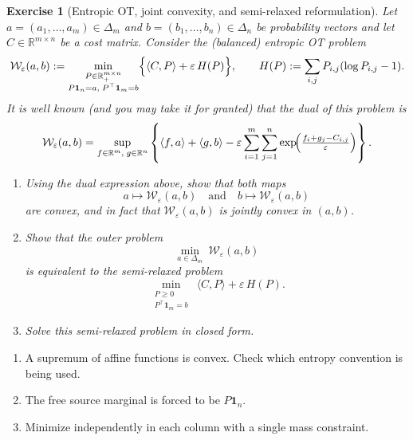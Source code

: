 \documentclass[11pt,a4paper]{article}
\theoremstyle{exostyle}
\newtheorem{exercise}{Exercise}
\newcommand{\R}{\mathbb{R}}
\newcommand{\W}{\mathcal{W}}
\begin{document}
\begin{exercise}[Entropic OT, joint convexity, and semi-relaxed reformulation]\label{ex:semi-relaxed-simple}
Let $a=(a_1,\dots,a_m)\in\Delta_m$ and $b=(b_1,\dots,b_n)\in\Delta_n$ be probability vectors and let $C\in\R^{m\times n}$ be a cost matrix. Consider the (balanced) entropic OT problem
\[
\W_\varepsilon(a,b)
:= \min_{\substack{P\in\R_+^{m\times n}\\ P\mathbf 1_n = a,\; P^\top \mathbf 1_m = b}}
\Bigl\{ \langle C,P\rangle + \varepsilon\,H(P) \Bigr\},
\qquad
H(P) := \sum_{i,j} P_{i,j}(\log P_{i,j}-1).
\]
It is well known (and you may take it for granted) that the dual of this problem is
\[
\W_\varepsilon(a,b)
= \sup_{f\in\R^m,\;g\in\R^n}
\left\{
\langle f,a\rangle + \langle g,b\rangle
- \varepsilon \sum_{i=1}^m \sum_{j=1}^n \exp\!\Bigl(\tfrac{f_i + g_j - C_{i,j}}{\varepsilon}\Bigr)
\right\}.
\]
\begin{enumerate}[label=\textbf{(\arabic*)}]
  \item Using the dual expression above, show that \emph{both} maps
  \[
  a \longmapsto \W_\varepsilon(a,b)
  \quad\text{and}\quad
  b \longmapsto \W_\varepsilon(a,b)
  \]
  are convex, and in fact that $\W_\varepsilon(a,b)$ is jointly convex in $(a,b)$.
  \item Show that the outer problem
  \[
  \min_{a\in\Delta_m} \ \W_\varepsilon(a,b)
  \]
  is equivalent to the semi-relaxed problem
  \[
  \min_{\substack{P\ge0\\ P^\top \mathbf 1_m = b}}
  \ \langle C,P\rangle + \varepsilon\,H(P).
  \]
  \item Solve this semi-relaxed problem in closed form.
 \end{enumerate}
\end{exercise}
\begin{hints}
\begin{enumerate}[label=(\arabic*)]\item A supremum of affine functions is convex. Check which entropy convention is being used.\item The free source marginal is forced to be $P\mathbf1_n$.\item Minimize independently in each column with a single mass constraint.\end{enumerate}
\end{hints}
\end{document}
